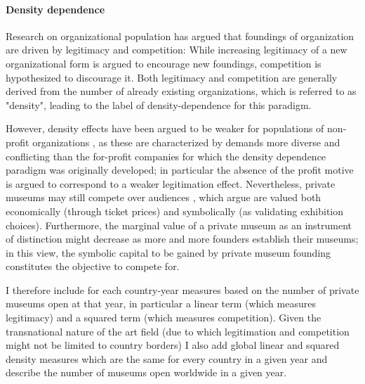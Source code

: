 \documentclass[11pt]{article}
\begin{document}
\paragraph*{Density dependence}

Research on organizational population \parencite{Carroll_1989_density,Hannan_1992_dynamics} has argued that foundings of organization are driven by legitimacy and competition:
While increasing legitimacy of a new organizational form is argued to encourage new foundings, competition is hypothesized to discourage it.
Both legitimacy and competition are generally derived from the number of already existing organizations, which is referred to as "density", leading to the label of density-dependence for this paradigm. 


However, density effects have been argued to be weaker for populations of non-profit organizations \parencite{Bogaert_etal_2014_ecological}, as these are characterized by demands more diverse and conflicting than the for-profit companies for which the density dependence paradigm was originally developed; in particular the absence of the profit motive is argued to correspond to a weaker legitimation effect. 
Nevertheless, private museums may still compete over audiences \parencite[p.14]{Adam_2021_rise}, which \textcite{Frey_Meier_2002_beyeler} argue are valued both economically (through ticket prices) and symbolically (as validating exhibition choices).
Furthermore, the marginal value of a private museum as an instrument of distinction might decrease as more and more founders establish their museums; in this view, the symbolic capital to be gained by private museum founding constitutes the objective to compete for. 



I therefore include for each country-year measures based on the number of private museums open at that year, in particular a linear term (which measures legitimacy) and a squared term (which measures competition).
Given the transnational nature of the art field (due to which legitimation and competition might not be limited to country borders) I also add global linear and squared density measures which are the same for every country in a given year and describe the number of museums open worldwide in a given year.
\end{document}
